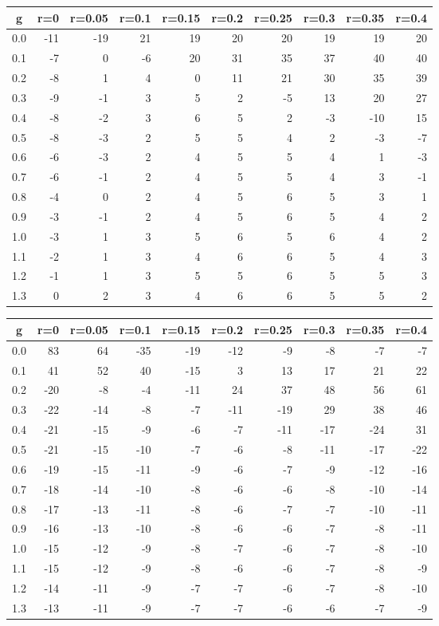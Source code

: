 %
\begin{table}[!tbp]
 \begin{center}
 \begin{tabular}{rrrrrrrrrr}\hline\hline
\multicolumn{1}{c}{g}&\multicolumn{1}{c}{r=0}&\multicolumn{1}{c}{r=0.05}&\multicolumn{1}{c}{r=0.1}&\multicolumn{1}{c}{r=0.15}&\multicolumn{1}{c}{r=0.2}&\multicolumn{1}{c}{r=0.25}&\multicolumn{1}{c}{r=0.3}&\multicolumn{1}{c}{r=0.35}&\multicolumn{1}{c}{r=0.4}\tabularnewline
\hline
0.0&-11&-19&21&19&20&20&19& 19&20\tabularnewline
0.1& -7&  0&-6&20&31&35&37& 40&40\tabularnewline
0.2& -8&  1& 4& 0&11&21&30& 35&39\tabularnewline
0.3& -9& -1& 3& 5& 2&-5&13& 20&27\tabularnewline
0.4& -8& -2& 3& 6& 5& 2&-3&-10&15\tabularnewline
0.5& -8& -3& 2& 5& 5& 4& 2& -3&-7\tabularnewline
0.6& -6& -3& 2& 4& 5& 5& 4&  1&-3\tabularnewline
0.7& -6& -1& 2& 4& 5& 5& 4&  3&-1\tabularnewline
0.8& -4&  0& 2& 4& 5& 6& 5&  3& 1\tabularnewline
0.9& -3& -1& 2& 4& 5& 6& 5&  4& 2\tabularnewline
1.0& -3&  1& 3& 5& 6& 5& 6&  4& 2\tabularnewline
1.1& -2&  1& 3& 4& 6& 6& 5&  4& 3\tabularnewline
1.2& -1&  1& 3& 5& 5& 6& 5&  5& 3\tabularnewline
1.3&  0&  2& 3& 4& 6& 6& 5&  5& 2\tabularnewline
\hline
\end{tabular}

\end{center}

\end{table}

%
\begin{table}[!tbp]
 \begin{center}
 \begin{tabular}{rrrrrrrrrr}\hline\hline
\multicolumn{1}{c}{g}&\multicolumn{1}{c}{r=0}&\multicolumn{1}{c}{r=0.05}&\multicolumn{1}{c}{r=0.1}&\multicolumn{1}{c}{r=0.15}&\multicolumn{1}{c}{r=0.2}&\multicolumn{1}{c}{r=0.25}&\multicolumn{1}{c}{r=0.3}&\multicolumn{1}{c}{r=0.35}&\multicolumn{1}{c}{r=0.4}\tabularnewline
\hline
0.0& 83& 64&-35&-19&-12& -9& -8& -7& -7\tabularnewline
0.1& 41& 52& 40&-15&  3& 13& 17& 21& 22\tabularnewline
0.2&-20& -8& -4&-11& 24& 37& 48& 56& 61\tabularnewline
0.3&-22&-14& -8& -7&-11&-19& 29& 38& 46\tabularnewline
0.4&-21&-15& -9& -6& -7&-11&-17&-24& 31\tabularnewline
0.5&-21&-15&-10& -7& -6& -8&-11&-17&-22\tabularnewline
0.6&-19&-15&-11& -9& -6& -7& -9&-12&-16\tabularnewline
0.7&-18&-14&-10& -8& -6& -6& -8&-10&-14\tabularnewline
0.8&-17&-13&-11& -8& -6& -7& -7&-10&-11\tabularnewline
0.9&-16&-13&-10& -8& -6& -6& -7& -8&-11\tabularnewline
1.0&-15&-12& -9& -8& -7& -6& -7& -8&-10\tabularnewline
1.1&-15&-12& -9& -8& -6& -6& -7& -8& -9\tabularnewline
1.2&-14&-11& -9& -7& -7& -6& -7& -8&-10\tabularnewline
1.3&-13&-11& -9& -7& -7& -6& -6& -7& -9\tabularnewline
\hline
\end{tabular}

\end{center}

\end{table}

